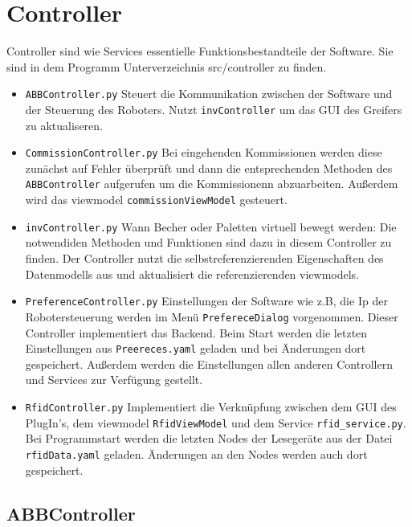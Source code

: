 \section{Controller}
Controller sind wie Services essentielle Funktionsbestandteile der Software. Sie sind in dem Programm Unterverzeichnis \glqq src/controller \grqq zu finden. 
\begin{itemize}
    \item \verb|ABBController.py| Steuert die Kommunikation zwischen der Software und der Steuerung des Roboters. Nutzt \verb|invController| um das GUI des Greifers zu aktualiseren.
    \item \verb|CommissionController.py| Bei eingehenden Kommissionen werden diese zunächst auf Fehler überprüft und dann die entsprechenden Methoden des \verb|ABBController| aufgerufen um die Kommissionenn abzuarbeiten. Außerdem wird das viewmodel \verb|commissionViewModel| gesteuert. 
    \item \verb|invController.py| Wann Becher oder Paletten virtuell bewegt werden: Die notwendiden Methoden und Funktionen sind dazu in diesem Controller zu finden. Der Controller nutzt die selbstreferenzierenden Eigenschaften des Datenmodells aus und aktualisiert die referenzierenden viewmodels.
    \item \verb|PreferenceController.py| Einstellungen der Software wie z.B, die Ip der Robotersteuerung werden im Menü \verb|PrefereceDialog| vorgenommen. Dieser Controller implementiert das Backend. Beim Start werden die letzten Einstellungen aus \verb|Preereces.yaml| geladen und bei Änderungen dort gespeichert. Außerdem werden die Einstellungen allen anderen Controllern und Services zur Verfügung gestellt.
    \item \verb|RfidController.py| Implementiert die Verknüpfung zwischen dem GUI des PlugIn's, dem viewmodel \verb|RfidViewModel| und dem Service \verb|rfid_service.py|. Bei Programmstart werden die letzten Nodes der Lesegeräte aus der Datei \verb|rfidData.yaml| geladen. Änderungen an den Nodes werden auch dort gespeichert. 
\end{itemize}
\subsection{ABBController}

